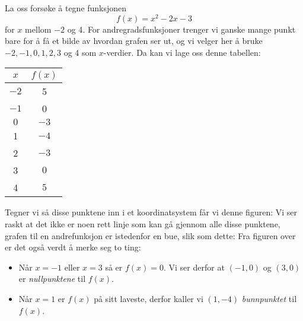 La oss forsøke å tegne funksjonen 
\[ f(x)=x^2-2x-3 \]
for $ x $ mellom $ -2 $ og 4. For andregradsfunksjoner trenger vi ganske mange punkt bare for å få et bilde av hvordan grafen ser ut, og vi velger her å bruke  $ {-2,-1, 0, 1, 2, 3}$ og 4 som $ x $-verdier. Da kan vi lage oss denne tabellen:

\quad
\parbox{0.2\linewidth}{\begin{tabular}{|c| c|}
		\hline
		$ x $ & $ f(x) $ \\ \hline
		$ -2 $ & 5 \\
		$ -1 $ &0 \\
		$ 0 $ & $ -3 $ \\ 
		1 & $ -4 $ \\
		2 & $ -3 $ \\
		3 & $ 0 $ \\
		4 &$ 5 $ \\ \hline
\end{tabular}}

Tegner vi så disse punktene inn i et koordinatsystem får vi denne figuren:
Vi ser raskt at det ikke er noen rett linje som kan gå gjennom alle disse punktene, grafen til en andrefunksjon er istedenfor en bue, slik som dette:
Fra figuren over er det også verdt å merke seg to ting:
\begin{itemize}
		\item Når $ {x=-1} $ eller $ {x=3} $ så er $ f(x)=0 $. Vi ser derfor at $ (-1, 0) $ og $ (3, 0) $ er \textit{nullpunktene} til $ f(x) $.
		\item Når $ {x=1} $ er $ f(x) $ på sitt laveste, derfor kaller vi $ (1, -4) $ \textit{bunnpunktet} til $ f(x) $.
\end{itemize}

